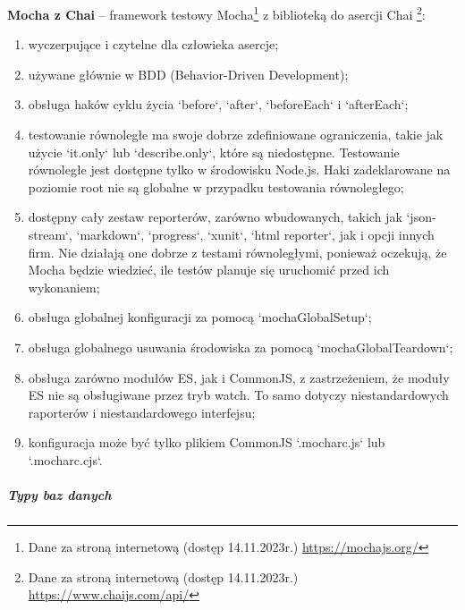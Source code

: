 \documentclass[12pt, a4paper, twoside, openany]{book}
\begin{document}
\textbf{Mocha z Chai} -- framework testowy Mocha\footnote{Dane za stroną internetową (dostęp 14.11.2023r.) \url{https://mochajs.org/}} z biblioteką do asercji Chai \footnote{Dane za stroną internetową (dostęp 14.11.2023r.) \url{https://www.chaijs.com/api/}}:
\begin{enumerate}[label=--]
    \item wyczerpujące i czytelne dla człowieka asercje;
    \item używane głównie w BDD (Behavior-Driven Development);
    \item obsługa haków cyklu życia `before`, `after`, `beforeEach` i `afterEach`;
    \item testowanie równoległe ma swoje dobrze zdefiniowane ograniczenia, takie jak użycie `it.only` lub `describe.only`, które są niedostępne. Testowanie równoległe jest dostępne tylko w środowisku Node.js. Haki zadeklarowane na poziomie root nie są globalne w przypadku testowania równoległego;
    \item dostępny cały zestaw reporterów, zarówno wbudowanych, takich jak `json-stream`, `markdown`, `progress`, `xunit`, `html reporter`, jak i opcji innych firm. Nie działają one dobrze z testami równoległymi, ponieważ oczekują, że Mocha będzie wiedzieć, ile testów planuje się uruchomić przed ich wykonaniem;
    \item obsługa globalnej konfiguracji za pomocą `mochaGlobalSetup`;
    \item obsługa globalnego usuwania środowiska za pomocą `mochaGlobalTeardown`;
    \item obsługa zarówno modułów ES, jak i CommonJS, z zastrzeżeniem, że moduły ES nie są obsługiwane przez tryb watch. To samo dotyczy niestandardowych raporterów i niestandardowego interfejsu;
    \item konfiguracja może być tylko plikiem CommonJS `.mocharc.js` lub `.mocharc.cjs`.
\end{enumerate}

\subparagraph{Typy baz danych\\}
\end{document}
